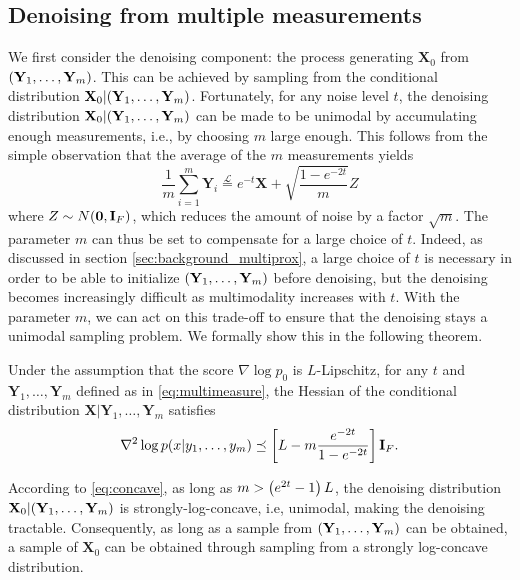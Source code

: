 \subsection{Denoising from multiple measurements}
We first consider the denoising component: the process generating $\mathbf{X}_0$ from $\mathopen{}\left(\mathbf{Y}_1, \dots, \mathbf{Y}_m\right)$. This can be achieved by sampling from the conditional distribution $\mathbf{X}_0|\mathopen{}\left(\mathbf{Y}_1, \dots, \mathbf{Y}_m\right)$. Fortunately, for any noise level $t$, the denoising distribution $\mathbf{X}_0|\mathopen{}\left(\mathbf{Y}_1, \dots, \mathbf{Y}_m\right)$ can be made to be unimodal by accumulating enough measurements, i.e., by choosing $m$ large enough. This follows from the simple observation that the average of the $m$ measurements yields
\begin{equation}
\frac{1}{m}\sum_{i=1}^m \mathbf{Y}_i \overset{\mathcal{L}}{=}  e^{-t} \mathbf{X} + \sqrt{\frac{1 - e^{-2t}}{m}}Z
\label{eq:noisereduction}
\end{equation}
where $Z \sim N\mathopen{}\left(\mathbf{0}, \mathbf{I}_F\right)$, which reduces the amount of noise by a factor $\sqrt{m}$. The parameter $m$ can thus be set to compensate for a large choice of $t$. Indeed, as discussed in section \ref{sec:background_multiprox}, a large choice of $t$ is necessary in order to be able to initialize $\mathopen{}\left(\mathbf{Y}_1, \dots, \mathbf{Y}_m\right)$ before denoising, but the denoising becomes increasingly difficult as multimodality increases with $t$. With the parameter $m$, we can act on this trade-off to ensure that the denoising stays a unimodal sampling problem. We formally show this in the following theorem. 

\begin{theorem}
\label{thm:unimodality}
    Under the assumption that the score $\nabla \log p_0$ is $L$-Lipschitz, for any $t$ and $\mathbf{Y}_1, \dots, \mathbf{Y}_m$ defined as in \eqref{eq:multimeasure}, the Hessian of the conditional distribution $\mathbf{X}|\mathbf{Y}_1, \dots, \mathbf{Y}_m$ satisfies
    \begin{equation}
    \nabla ^2 \log p(x|y_1, \dots, y_m) \preceq \mathopen{}\left[L - m\frac{e^{-2t}}{1 - e^{-2t}}\right]\mathbf{I}_F.
    \label{eq:concave}
    \end{equation}
\end{theorem}

According to \eqref{eq:concave}, as long as $m > \mathopen{}\left(e^{2t} - 1\right) L$, the denoising distribution $\mathbf{X}_0|\mathopen{}\left(\mathbf{Y}_1, \dots, \mathbf{Y}_m\right)$ is strongly-log-concave, i.e, unimodal, making the denoising tractable. Consequently, as long as a sample from $\mathopen{}\left(\mathbf{Y}_1, \dots, \mathbf{Y}_m\right)$ can be obtained, a sample of $\mathbf{X}_0$ can be obtained through sampling from a strongly log-concave distribution.

